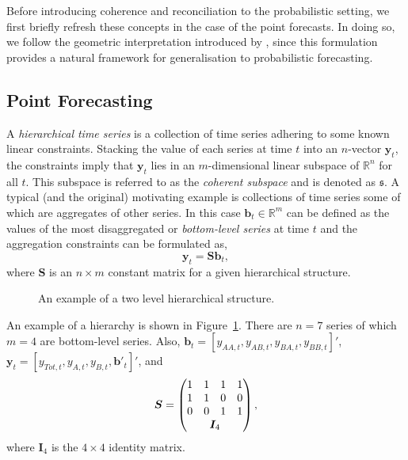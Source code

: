 \documentclass[12pt]{article}
\theoremstyle{definition}
\begin{document}
Before introducing coherence and reconciliation to the probabilistic setting, we first briefly refresh these concepts in the case of the point forecasts.  In doing so, we follow the geometric interpretation introduced by \cite{PanEtAl2019HF}, since this formulation provides a natural framework for generalisation to probabilistic forecasting.


\subsection{Point Forecasting}\label{sec:Notat&Prelim}

A \emph{hierarchical time series} is a collection of time series adhering to some known linear constraints.  Stacking the value of each series at time $t$ into an $n$-vector ${\bm y}_t$, the constraints imply that ${\bm y}_t$ lies in an $m$-dimensional linear subspace of $\mathbb{R}^n$ for all $t$.  This subspace is referred to as the {\em coherent subspace} and is denoted as $\mathfrak{s}$.  A typical (and the original) motivating example is collections of time series some of which are aggregates of other series. In this case $\bm{b}_t \in \mathbb{R}^m$ can be defined as the values of the most disaggregated or \emph{bottom-level series} at time $t$ and the aggregation constraints can be formulated as,
\begin{equation}\label{eq:coheObservations}
\bm{y}_t = \bm{Sb}_t,
\end{equation}
where $\bm{S}$ is an $n \times m$ constant matrix for a given hierarchical structure.

\begin{figure}[H]
	\begin{center}
		 
		 
		\qobitree
	\end{center}
	\caption{An example of a two level hierarchical structure.}\label{fig:twoL-hier}
\end{figure}
An example of a hierarchy is shown in Figure~\ref{fig:twoL-hier}. There are $n=7$ series of which $m=4$ are bottom-level series. Also, $\bm{b}_t = [y_{AA,t}, y_{AB,t}, y_{BA,t}, y_{BB,t}]'$, $\bm{y}_t = [y_{Tot,t},y_{A,t}, y_{B,t},\bm{b}'_t]'$,  and
\[
\bm{S} = \begin{pmatrix}
1 & 1 & 1 & 1 \\
1 & 1 & 0 & 0 \\
0 & 0 & 1 & 1 \\
& \multicolumn{2}{c}{\bm{I}_4} &
\end{pmatrix},
\]
where $\bm{I}_4$ is the $4\times 4$ identity matrix.
\end{document}
